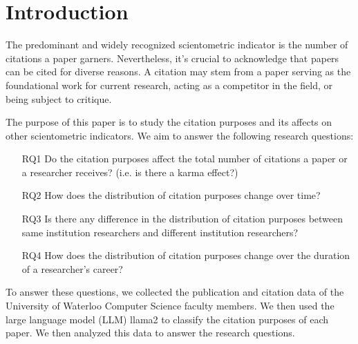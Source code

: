 \documentclass[sigconf]{acmart}
\begin{document}


\maketitle

\section{Introduction}
The predominant and widely recognized scientometric indicator is the number 
of citations a paper garners. Nevertheless, it's crucial to acknowledge that 
papers can be cited for diverse reasons. A citation may stem from a paper 
serving as the foundational work for current research, acting as a competitor 
in the field, or being subject to critique. 

The purpose of this paper is to study the citation purposes and its affects
on other scientometric indicators. We aim to answer the following research 
questions:

\begin{enumerate}
    \item[RQ1] Do the citation purposes affect the total number of
    citations a paper or a researcher receives? (i.e. is there a karma effect?)
    \item[RQ2] How does the distribution of citation purposes change over time?
    \item[RQ3] Is there any difference in the distribution of citation purposes
    between same institution researchers and different institution researchers? 
    \item[RQ4] How does the distribution of citation purposes change over the
    duration of a researcher's career?
\end{enumerate}

To answer these questions, we collected the publication and citation data of
the University of Waterloo Computer Science faculty members. We then used
the large language model (LLM) llama2 \cite{touvron2023llama} to classify the citation 
purposes of each paper. We then analyzed this data to answer the research questions.
\end{document}
